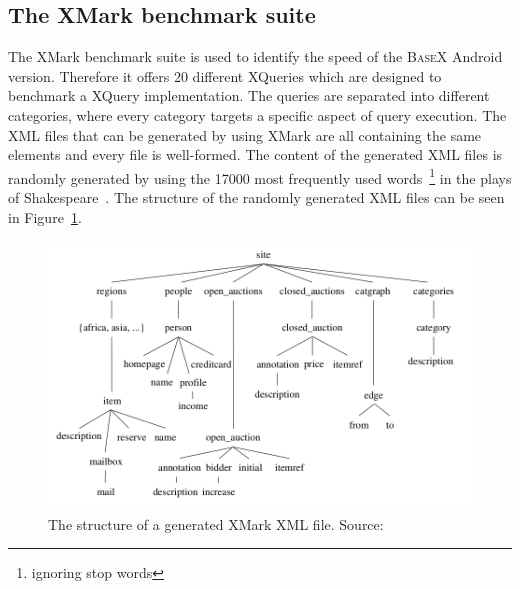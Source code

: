 \subsection{The XMark benchmark suite}
\label{subsec:the-xmark-benchmark-suite}
The XMark benchmark suite is used to identify the speed of the \textsc{BaseX} Android version.
Therefore it offers 20 different XQueries which are designed to benchmark a XQuery implementation.
The queries are separated into different categories, where every category targets a specific aspect of query execution.
The XML files that can be generated by using XMark are all containing the same elements and every file is well-formed.
The content of the generated XML files is randomly generated by using the 17000 most frequently used words~\footnote{ignoring stop words} in the plays of Shakespeare~\cite{schmidtxmark}.
The structure of the randomly generated XML files can be seen in Figure~\ref{fig:xmark-file-structure}.
\begin{figure}[h]
\begin{center}
\includegraphics[scale=0.42]{images/xmark-file-elements.png} 
\caption{The structure of a generated XMark XML file. Source:\cite{schmidtxmark}}
\label{fig:xmark-file-structure}
\end{center}
\end{figure}

